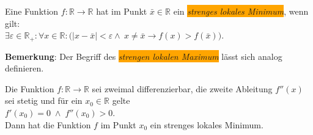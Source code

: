 \begin{Definition} \lb
  Eine Funktion $f:\mathbb{R} \rightarrow \mathbb{R}$ hat im Punkt $\bar{x}\in \mathbb{R}$
  ein \colorbox{orange}{\emph{strenges lokales Minimum}}, wenn gilt:
  \\[0.2cm]
  \hspace*{1.3cm}
  $\exists \varepsilon \in \mathbb{R}_+: \forall x \in \mathbb{R}:\bigl( 
  |x - \bar{x}| < \varepsilon \wedge\ x \not= \bar{x} \rightarrow f(x) > f(\bar{x})\bigr)$.
\eod
\end{Definition}

\noindent
\textbf{Bemerkung}:  Der Begriff des \colorbox{orange}{\emph{strengen lokalen Maximum}} l\"asst sich
analog definieren. 

\begin{Satz} \label{satz:minimum}
  Die Funktion $f:\mathbb{R} \rightarrow \mathbb{R}$ sei zweimal differenzierbar, die
  zweite Ableitung $f''(x)$ sei stetig und f\"ur
  ein $x_0 \in \mathbb{R}$ gelte
  \\[0.2cm]
  \hspace*{1.3cm}
  $f'(x_0) = 0 \;\wedge\; f''(x_0) > 0$.
  \\[0.2cm]
  Dann hat die Funktion $f$ im Punkt $x_0$ ein strenges lokales Minimum.
\end{Satz}

